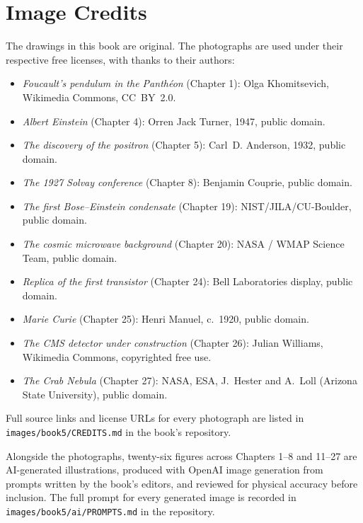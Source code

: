 \chapter*{Image Credits}

The drawings in this book are original. The photographs are used
under their respective free licenses, with thanks to their authors:

\begin{itemize}
  \item \emph{Foucault's pendulum in the Panthéon} (Chapter 1):
        Olga Khomitsevich, Wikimedia Commons, CC~BY~2.0.
  \item \emph{Albert Einstein} (Chapter 4): Orren Jack Turner,
        1947, public domain.
  \item \emph{The discovery of the positron} (Chapter 5): Carl~D.
        Anderson, 1932, public domain.
  \item \emph{The 1927 Solvay conference} (Chapter 8): Benjamin
        Couprie, public domain.
  \item \emph{The first Bose--Einstein condensate} (Chapter 19):
        NIST/JILA/CU-Boulder, public domain.
  \item \emph{The cosmic microwave background} (Chapter 20):
        NASA / WMAP Science Team, public domain.
  \item \emph{Replica of the first transistor} (Chapter 24):
        Bell Laboratories display, public domain.
  \item \emph{Marie Curie} (Chapter 25): Henri Manuel,
        c.~1920, public domain.
  \item \emph{The CMS detector under construction} (Chapter 26):
        Julian Williams, Wikimedia Commons, copyrighted free use.
  \item \emph{The Crab Nebula} (Chapter 27): NASA, ESA,
        J.~Hester and A.~Loll (Arizona State University), public
        domain.
\end{itemize}

Full source links and license URLs for every photograph are listed
in \texttt{images/book5/CREDITS.md} in the book's repository.

\bigskip
Alongside the photographs, twenty-six figures across Chapters 1--8
and 11--27 are AI-generated illustrations, produced with OpenAI image
generation from prompts written by the book's editors, and reviewed
for physical accuracy before inclusion. The full prompt for every
generated image is recorded in \texttt{images/book5/ai/PROMPTS.md} in
the repository.
\clearpage
